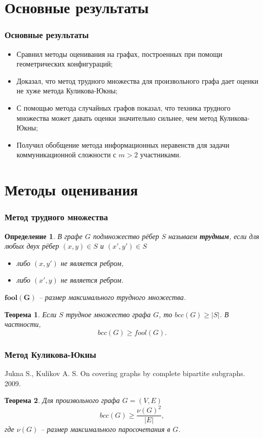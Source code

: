 \documentclass[utf8]{beamer}
\newtheorem{mdefinition}{Определение}[section]
\newtheorem{mtheorem}{Теорема}
\begin{document}
	\section{Основные результаты}
	\begin{frame}
		\frametitle{Основные результаты}
		\begin{itemize}
		    \item[1)] Сравнил методы оценивания на графах, построенных при помощи геометрических конфигураций;
		    \item[2)] Доказал, что метод трудного множества для произвольного графа дает оценки не хуже 
		    метода Куликова-Юкны;
		    \item[3)] С помощью метода случайных графов показал, что техника трудного множества может 
		    давать оценки значительно сильнее, чем метод Куликова-Юкны;
		    \item[4)] Получил обобщение метода информационных неравенств для задачи коммуникационной 
		    сложности с $m > 2$ участниками.
		\end{itemize}
	\end{frame}
	
	\section{Методы оценивания}
	\begin{frame}
		\frametitle{Метод трудного множества}
		\begin{mdefinition}
		     В графе $G$ подмножество рёбер $S$ называем \textbf{трудным}, если для любых двух рёбер $(x,y)\in S$ и $(x',y')\in S$ 
		     \begin{itemize}
		         \item либо $(x,y')$ не является ребром,
		         \item либо $(x',y)$ не является ребром.
		     \end{itemize}

			$\boldsymbol{fool(G)}$ -- размер максимального трудного множества.
		\end{mdefinition}
		
		\begin{mtheorem}
		    Если $S$ трудное множество графа $G$, то $bcc(G) \geq |S|$. В частности, $$bcc(G) \geq fool(G).$$  
		\end{mtheorem}
	\end{frame}
	
	\begin{frame}
		\frametitle{Метод Куликова-Юкны}
		Jukna S., Kulikov A. S. On covering graphs by complete bipartite subgraphs. 2009.
		
		\begin{mtheorem}
		    Для произвольного графа $G = (V, E)$ $$bcc(G) \geq \frac{\nu(G)^2}{|E|},$$ 
		    где $\nu(G)$ -- размер максимального паросочетания в $G$.
		\end{mtheorem}
	\end{frame}
	
\end{document}
